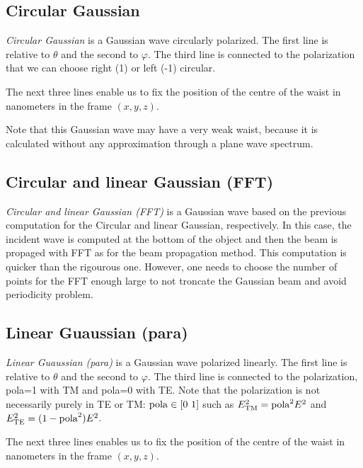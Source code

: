 \subsection{Circular Gaussian}

{\it Circular Gaussian} is a Gaussian wave circularly polarized. The
first line is relative to $\theta$ and the second to $\varphi$. The
third line is connected to the polarization that we can choose right
(1) or left (-1) circular.


The next three lines enable us to fix the position of the centre of the waist
in nanometers in the frame $(x,y,z)$.

Note that this Gaussian wave may have a very weak waist, because it is 
calculated without any approximation through a plane wave spectrum.

\subsection{Circular and linear Gaussian (FFT)}

{\it Circular and linear Gaussian (FFT)} is a Gaussian wave based on
the previous computation for the Circular and linear Gaussian,
respectively. In this case, the incident wave is computed at the
bottom of the object and then the beam is propaged with FFT as for the
beam propagation method. This computation is quicker than the
rigourous one. However, one needs to choose the number of points for
the FFT enough large to not troncate the Gaussian beam and avoid
periodicity problem.

\subsection{Linear Guaussian (para)}


{\it Linear Guaussian (para)} is a Gaussian wave polarized
linearly. The first line is relative to $\theta$ and the second to
$\varphi$. The third line is connected to the polarization, pola=1
with TM and pola=0 with TE.  Note that the polarization is not
necessarily purely in TE or TM: ${\rm pola}\in[0~1]$ such as
$E^2_{\rm TM}={\rm pola}^2E^2$ and $E^2_{\rm TE}=(1-{\rm pola}^2)E^2$.

The next three lines enables us to fix the position of the centre of
the waist in nanometers in the frame $(x,y,z)$.

